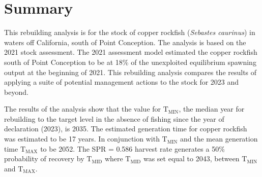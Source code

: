 \documentclass[11pt,
  english,
  a4paper,
]{article}
\begin{document}
\newcommand{\lt}{\ensuremath <}
\newcommand{\gt}{\ensuremath >}

\pagebreak
{}
\setcounter{page}{1}

\renewcommand{\thetable}{\roman{table}}
\renewcommand{\thefigure}{\roman{figure}}

\setlength\parskip{0.5em plus 0.1em minus 0.2em}


\hypertarget{summary}{%
\section*{Summary}\label{summary}}

\leavevmode\tagmcend\tagstructend


This rebuilding analysis is for the stock of copper rockfish (\emph{Sebastes caurinus}) in waters off California, south of Point Conception. The analysis is based on the 2021 stock assessment. The 2021 assessment model estimated the copper rockfish south of Point Conception to be at 18\% of the unexploited equilibrium spawning output at the beginning of 2021. This rebuilding analysis compares the results of applying a suite of potential management actions to the stock for 2023 and beyond.

\leavevmode\tagmcend\tagstructend\par


The results of the analysis show that the value for {\(\text{T}_\text{MIN}\)\leavevmode\tagmcend\tagstructend}, the median year for rebuilding to the target level in the absence of fishing since the year of declaration (2023), is 2035. The estimated generation time for copper rockfish was estimated to be 17 years. In conjunction with {\(\text{T}_\text{MIN}\)\leavevmode\tagmcend\tagstructend} and the mean generation time {\(\text{T}_\text{MAX}\)\leavevmode\tagmcend\tagstructend} to be 2052. The SPR = 0.586 harvest rate generates a 50\% probability of recovery by {\(\text{T}_\text{MID}\)\leavevmode\tagmcend\tagstructend} where {\(\text{T}_\text{MID}\)\leavevmode\tagmcend\tagstructend} was set equal to 2043, between {\(\text{T}_\text{MIN}\)\leavevmode\tagmcend\tagstructend} and {\(\text{T}_\text{MAX}\)\leavevmode\tagmcend\tagstructend}.
\end{document}
